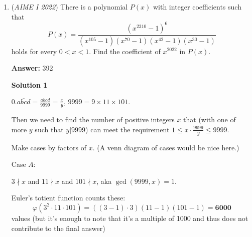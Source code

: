 \begin{enumerate}
 Now, we want to sum this over all possible $k$, for $0 \le k \le n$.

 This is $\sum_{k=0}^{n} k\binom{n}{k}\binom{n-1}{k-1}$. We can do something with the $k\binom{n}{k}$ term that was similar to something we did last time to obtain that this is also equal to $n\binom{n-1}{k-1}$.

 Then, the sum simplifies to $n\sum_{k=0}^{n} \binom{n-1}{k-1} \binom{n-1}{k-1}=n\sum_{k=0}^{n}\binom{n-1}{k-1}^{2}$.

 We can use Vandermode's again, with $x=y=n-1$ and $r=(k-1)+(k-1)=2k-2$. Then, the sum is equal to $n\binom{2n-2}{n-1}$.

 Now, the problem seeks $\frac{S_{2022}}{S_{2021}}$. This is equal to $\frac{2022\tbinom{4042}{2021}}{2021\tbinom{4040}{2020}}=\frac{\frac{2022 \cdot 4042!}{2021! \cdot 2021!}}{\frac{2021 \cdot 4040!}{2020! \cdot 2020!}}=\frac{2022 \cdot 4042! \cdot 2020! \cdot 2020!}{2021 \cdot 4040! \cdot 2021! \cdot 2021!}=\frac{2022 \cdot 4042 \cdot 4041}{2021 \cdot 2021 \cdot 2021}=\frac{2022 \cdot 2 \cdot 4041}{2021 \cdot 2021}$.

 We seek $2022 \cdot 2 \cdot 4041 + 2021 \cdot 2021 \pmod{1000}$. This is equivalent to $22 \cdot 82 + 21 \cdot 21 \equiv 804+441 \equiv \boxed{245} \pmod{1000}$, and we are done.

 


	\item (\textit{AIME I 2022}) There is a polynomial $P(x)$ with integer coefficients such that
 \[P(x)=\frac{(x^{2310}-1)^6}{(x^{105}-1)(x^{70}-1)(x^{42}-1)(x^{30}-1)}\]holds for every $0<x<1.$ Find the coefficient of $x^{2022}$ in $P(x)$.


 
 \textbf{Answer: }392



\textbf{Solution 1}

$0.\overline{abcd}=\frac{abcd}{9999} = \frac{x}{y}$, $9999=9\times 11\times 101$.

 Then we need to find the number of positive integers $x$ that (with one of more $y$ such that $y|9999$) can meet the requirement $1 \leq {x}\cdot\frac{9999}{y} \leq 9999$.

 Make cases by factors of $x$. (A venn diagram of cases would be nice here.)

 
Case $A$:

 $3 \nmid x$ and $11 \nmid x$ and $101 \nmid x$, aka $\gcd (9999, x)=1$.

 Euler's totient function counts these: 
 \[\varphi \left(3^2 \cdot 11 \cdot 101 \right) = ((3-1)\cdot 3)(11-1)(101-1)= \textbf{6000}\] values (but it's enough to note that it's a multiple of 1000 and thus does not contribute to the final answer)


\end{enumerate}

